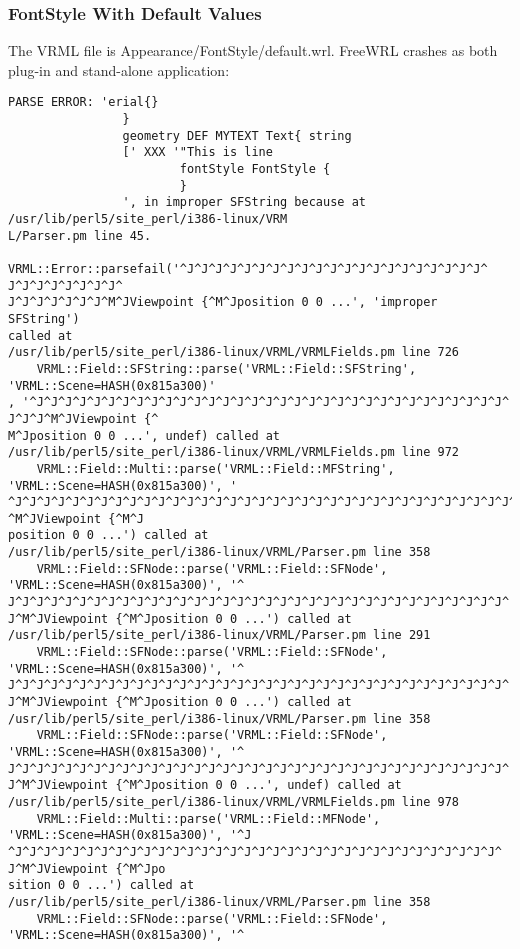 \documentclass[12pt,letterpaper]{article}
\newcommand{\FSA}{FontStyle With Default Values}
\begin{document}
\subsubsection{\FSA}
The VRML file is Appearance/FontStyle/default.wrl.
FreeWRL crashes as both plug-in and stand-alone application:
\begin{verbatim}
PARSE ERROR: 'erial{}
                }
                geometry DEF MYTEXT Text{ string
			    [' XXX '"This is line 
                        fontStyle FontStyle {
                        } 
                ', in improper SFString because at
/usr/lib/perl5/site_perl/i386-linux/VRM
L/Parser.pm line 45.
    VRML::Error::parsefail('^J^J^J^J^J^J^J^J^J^J^J^J^J^J^J^J^J^J^J^J^J^
J^J^J^J^J^J^J^J^
J^J^J^J^J^J^J^M^JViewpoint {^M^Jposition 0 0 ...', 'improper SFString')
called at
/usr/lib/perl5/site_perl/i386-linux/VRML/VRMLFields.pm line 726
    VRML::Field::SFString::parse('VRML::Field::SFString',
'VRML::Scene=HASH(0x815a300)'
, '^J^J^J^J^J^J^J^J^J^J^J^J^J^J^J^J^J^J^J^J^J^J^J^J^J^J^J^J^J^J^J^J^J^
J^J^J^M^JViewpoint {^
M^Jposition 0 0 ...', undef) called at 
/usr/lib/perl5/site_perl/i386-linux/VRML/VRMLFields.pm line 972
    VRML::Field::Multi::parse('VRML::Field::MFString',
'VRML::Scene=HASH(0x815a300)', '
^J^J^J^J^J^J^J^J^J^J^J^J^J^J^J^J^J^J^J^J^J^J^J^J^J^J^J^J^J^J^J^J^J^J^J^
^M^JViewpoint {^M^J
position 0 0 ...') called at
/usr/lib/perl5/site_perl/i386-linux/VRML/Parser.pm line 358
    VRML::Field::SFNode::parse('VRML::Field::SFNode',
'VRML::Scene=HASH(0x815a300)', '^
J^J^J^J^J^J^J^J^J^J^J^J^J^J^J^J^J^J^J^J^J^J^J^J^J^J^J^J^J^J^J^J^J^J^J^
J^M^JViewpoint {^M^Jposition 0 0 ...') called at
/usr/lib/perl5/site_perl/i386-linux/VRML/Parser.pm line 291
    VRML::Field::SFNode::parse('VRML::Field::SFNode',
'VRML::Scene=HASH(0x815a300)', '^
J^J^J^J^J^J^J^J^J^J^J^J^J^J^J^J^J^J^J^J^J^J^J^J^J^J^J^J^J^J^J^J^J^J^J^
J^M^JViewpoint {^M^Jposition 0 0 ...') called at
/usr/lib/perl5/site_perl/i386-linux/VRML/Parser.pm line 358
    VRML::Field::SFNode::parse('VRML::Field::SFNode',
'VRML::Scene=HASH(0x815a300)', '^
J^J^J^J^J^J^J^J^J^J^J^J^J^J^J^J^J^J^J^J^J^J^J^J^J^J^J^J^J^J^J^J^J^J^J^
J^M^JViewpoint {^M^Jposition 0 0 ...', undef) called at
/usr/lib/perl5/site_perl/i386-linux/VRML/VRMLFields.pm line 978
    VRML::Field::Multi::parse('VRML::Field::MFNode',
'VRML::Scene=HASH(0x815a300)', '^J
^J^J^J^J^J^J^J^J^J^J^J^J^J^J^J^J^J^J^J^J^J^J^J^J^J^J^J^J^J^J^J^J^J^J^
J^M^JViewpoint {^M^Jpo
sition 0 0 ...') called at
/usr/lib/perl5/site_perl/i386-linux/VRML/Parser.pm line 358
    VRML::Field::SFNode::parse('VRML::Field::SFNode',
'VRML::Scene=HASH(0x815a300)', '^

\end{verbatim}
\end{document}
